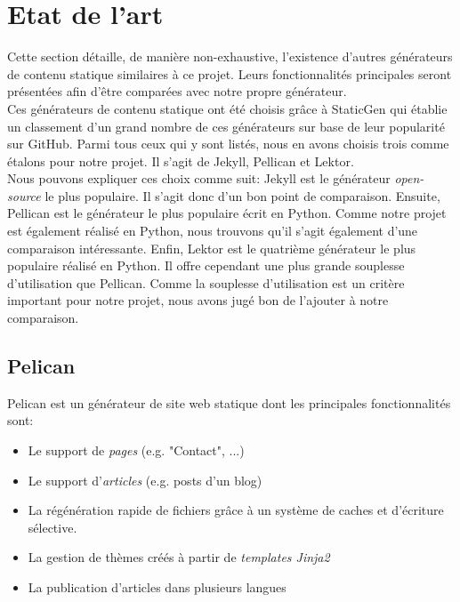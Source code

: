 \section{Etat de l'art}
	Cette section détaille, de manière non-exhaustive, l'existence d'autres générateurs de contenu statique similaires à ce projet. Leurs fonctionnalités principales seront présentées afin d'être comparées avec notre propre générateur.\\
	
	Ces générateurs de contenu statique ont été choisis grâce à StaticGen \cite{StaticGen} qui établie un classement d'un grand nombre de ces générateurs sur base de leur popularité sur GitHub. Parmi tous ceux qui y sont listés, nous en avons choisis trois comme étalons pour notre projet. Il s'agit de Jekyll, Pellican et Lektor.\\
	
	Nous pouvons expliquer ces choix comme suit: Jekyll est le générateur \textit{open-source} le plus populaire. Il s'agit donc d'un bon point de comparaison. Ensuite, Pellican est le générateur le plus populaire écrit en Python. Comme notre projet est également réalisé en Python, nous trouvons qu'il s'agit également d'une comparaison intéressante. Enfin, Lektor est le quatrième générateur le plus populaire réalisé en Python. Il offre cependant une plus grande souplesse d'utilisation que Pellican. Comme la souplesse d'utilisation est un critère important pour notre projet, nous avons jugé bon de l'ajouter à notre comparaison.
	
	\subsection*{Pelican}
	Pelican \cite{Pelican} est un générateur de site web statique dont les principales fonctionnalités sont:
	\begin{itemize}
		\item Le support de \textit{pages} (e.g. "Contact", ...)
		\item Le support d'\textit{articles} (e.g. posts d'un blog)
		\item La régénération rapide de fichiers grâce à un système de caches et d'écriture sélective.
		\item La gestion de thèmes créés à partir de \textit{templates Jinja2}
		\item La publication d'articles dans plusieurs langues
	\end{itemize}
	
